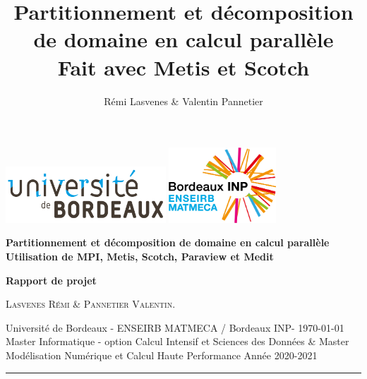 \documentclass[a4paper,11pt]{article}
\title{Partitionnement et décomposition de domaine en calcul parallèle\\
{\normalsize Fait avec Metis et Scotch}}
\author{Rémi Lasvenes \& Valentin Pannetier}
\newenvironment{novspacecenter}
{\parskip=0pt\par\nopagebreak\centering}
{\par\noindent\ignorespacesafterend}
\begin{document}
\begin{titlepage}
	\begin{novspacecenter}
		\includegraphics[width=60mm]{logo_universite.png}
		\hspace{2cm}
		\includegraphics[width=40mm]{logo-matmeca.jpg}
	\end{novspacecenter}
	\vskip10mm
\raggedright
	{
		\fontsize{22}{26.4}
		\bfseries
		\boldmath
		\hspace{-1.3cm} Partitionnement et décomposition de domaine en calcul parallèle\\
		{\normalsize Utilisation de MPI, Metis, Scotch, Paraview et Medit}
		\par
	}
	\vskip8mm
	{
		\fontsize{20}{24}
		\boldmath
		\textbf{Rapport de projet}
		\par
	}
	{%
		\fontsize{15}{18}
		\boldmath
		\textsc{Lasvenes Rémi} \& \textsc{Pannetier Valentin}.
		\par
	}
	\vfill
	{
		\large
		\vfill
			
		Université de Bordeaux - ENSEIRB MATMECA / Bordeaux INP- \today\\
		Master Informatique - option Calcul Intensif et Sciences des Données \& Master Modélisation Numérique et Calcul Haute Performance \hfill  Année 2020-2021
	}
	\vfill
	\rule{\textwidth}{0.4pt}
	\vfill
	\begin{tcolorbox}[enhanced jigsaw, colback=charitegrayarea,colframe=MyRed,halign=left,leftrule=2mm, rightrule=0mm, toprule=0em, bottomrule=0em,arc=0pt]
	\tableofcontents
	\end{tcolorbox}
	\vfill
\end{titlepage}
\end{document}

